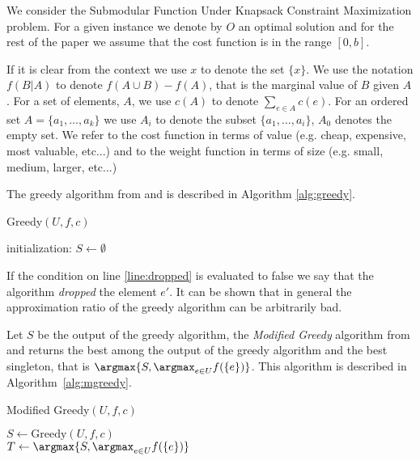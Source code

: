 We consider the Submodular Function Under
Knapsack Constraint Maximization problem.
For a given instance we denote by $O$ an optimal solution and for the rest of the 
paper we assume that the cost function is in the range $[0, b]$.
 
If it is clear from the context we use $x$ to denote the set $\{x\}$. 
We use the notation $f(B|A)$ to denote $f(A \cup B) - f(A)$, that is the marginal value of $B$
given $A$. 
For a set of elements, $A$, we use $c(A)$ to denote $\sum_{e \in A}c(e)$.
For an ordered set $A = \{a_1, \dots, a_k\}$ we use $A_i$ to denote the subset 
$\{a_1, \dots, a_i\}$, $A_0$ denotes the empty set.
We refer to the cost function in terms of value (e.g. cheap, expensive, most valuable, etc...) and 
to the weight function in terms of size (e.g. small, medium, larger, etc...) 

The greedy algorithm from \cite{khuller1999budgeted} and \cite{krause2005note}
is described in Algorithm \ref{alg:greedy}.

\begin{algorithm}[H]
\caption{Greedy$(U, f, c)$}
\label{alg:greedy}

initialization: $S \leftarrow \emptyset$
\\
\end{algorithm}
 
If the condition on line \ref{line:dropped} is evaluated to false we say that
the algorithm \emph{dropped} the element $e'$.
It can be shown that in general the approximation ratio of the greedy algorithm 
can be arbitrarily bad.

Let $S$ be the output of the greedy algorithm, the \emph{Modified Greedy} algorithm 
from \cite{khuller1999budgeted} and \cite{krause2005note} 
returns the best among the output of the greedy algorithm and the best singleton, 
that is $\argmax\{S, \displaystyle{\argmax_{e \in U}}f(\{e\})\}$.
This algorithm is described in Algorithm~\ref{alg:mgreedy}.  

\begin{algorithm}[H]
\caption{Modified Greedy$(U, f, c)$}
\label{alg:mgreedy}

$S \leftarrow \text{Greedy}(U, f, c)$
\\
$T \leftarrow \argmax\{S, \argmax_{e \in U}f(\{e\})\}$
\\
\end{algorithm}

